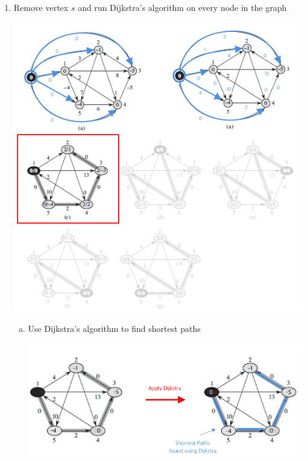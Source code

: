 \documentclass[12pt]{article}
\begin{document}
\begin{enumerate}[1.]
\begin{itemize}
\begin{enumerate}[1.]
            \item Remove vertex $s$ and run Dijkstra's algorithm on every node in the graph

            \begin{center}
            \includegraphics[width=\linewidth]{images/worksheet_4_solution_57.png}
            \end{center}

            \begin{enumerate}[a)]
                \item Use Dijkstra's algorithm to find shortest paths

                \begin{center}
                \includegraphics[width=\linewidth]{images/worksheet_4_solution_60.png}
                \end{center}


\end{enumerate}
\end{enumerate}
\end{itemize}
\end{enumerate}
\end{document}
